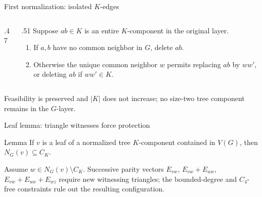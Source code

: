 \begin{frame}{First normalization: isolated \(K\)-edges}
 \begin{columns}[c,onlytextwidth]
  \begin{column}{.47\textwidth}
   \begin{center}\resizebox{.84\linewidth}{!}{\SingleKComponentFig}\end{center}
  \end{column}
  \begin{column}{.51\textwidth}
   Suppose \(ab\in K\) is an entire \(K\)-component in the original layer.
   \begin{enumerate}
    \item If \(a,b\) have no common neighbor in \(G\), delete \(ab\).
    \item Otherwise the unique common neighbor \(w\) permits replacing \(ab\) by \(ww'\), or deleting \(ab\) if \(ww'\in K\).
   \end{enumerate}
  \end{column}
 \end{columns}
 \vspace{.07cm}
 \small{} Feasibility is preserved and \(|K|\) does not increase; no size-two tree component remains in the \(G\)-layer.
\end{frame}


\begin{frame}{Leaf lemma: triangle witnesses force protection}
 \begin{block}{Lemma}
 If \(v\) is a leaf of a normalized tree \(K\)-component contained in \(V(G)\), then \(N_G(v)\subseteq C_K\).
 \end{block}
 \vspace{.15cm}
 \begin{center}\resizebox{.96\linewidth}{!}{\LeafCertificateFig}\end{center}
 \small{} Assume \(w\in N_G(v)\setminus C_K\). Successive parity vectors \(E_{vw}\), \(E_{vw}+E_{uw}\), \(E_{vw}+E_{uw}+E_{wz}\) require new witnessing triangles; the bounded-degree and \(C_4\)-free constraints rule out the resulting configuration.
\end{frame}


